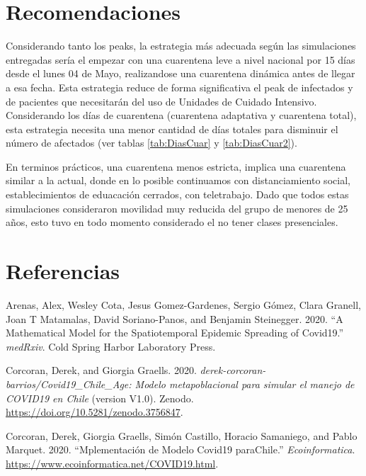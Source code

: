 \documentclass[]{article}
\begin{document}
\hypertarget{recomendaciones}{%
\section{Recomendaciones}\label{recomendaciones}}

Considerando tanto los peaks, la estrategia más adecuada según las simulaciones entregadas sería el empezar con una cuarentena leve a nivel nacional por 15 días desde el lunes 04 de Mayo, realizandose una cuarentena dinámica antes de llegar a esa fecha. Esta estrategia reduce de forma significativa el peak de infectados y de pacientes que necesitarán del uso de Unidades de Cuidado Intensivo. Considerando los días de cuarentena (cuarentena adaptativa y cuarentena total), esta estrategia necesita una menor cantidad de días totales para disminuir el número de afectados (ver tablas \ref{tab:DiasCuar} y \ref{tab:DiasCuar2}).

En terminos prácticos, una cuarentena menos estricta, implica una cuarentena similar a la actual, donde en lo posible continuamos con distanciamiento social, establecimientos de eduacación cerrados, con teletrabajo. Dado que todos estas simulaciones consideraron movilidad muy reducida del grupo de menores de 25 años, esto tuvo en todo momento considerado el no tener clases presenciales.

\hypertarget{referencias}{%
\section*{Referencias}\label{referencias}}

\hypertarget{refs}{}
\leavevmode\hypertarget{ref-arenas2020mathematical}{}%
Arenas, Alex, Wesley Cota, Jesus Gomez-Gardenes, Sergio Gómez, Clara Granell, Joan T Matamalas, David Soriano-Panos, and Benjamin Steinegger. 2020. ``A Mathematical Model for the Spatiotemporal Epidemic Spreading of Covid19.'' \emph{medRxiv}. Cold Spring Harbor Laboratory Press.

\leavevmode\hypertarget{ref-derek_corcoran_barrios_2020_3756847}{}%
Corcoran, Derek, and Giorgia Graells. 2020. \emph{derek-corcoran-barrios/Covid19\_Chile\_Age: Modelo metapoblacional para simular el manejo de COVID19 en Chile} (version V1.0). Zenodo. \url{https://doi.org/10.5281/zenodo.3756847}.

\leavevmode\hypertarget{ref-corcoran_graells_2020}{}%
Corcoran, Derek, Giorgia Graells, Simón Castillo, Horacio Samaniego, and Pablo Marquet. 2020. ``Mplementación de Modelo Covid19 paraChile.'' \emph{Ecoinformatica}. \url{https://www.ecoinformatica.net/COVID19.html}.
\end{document}
